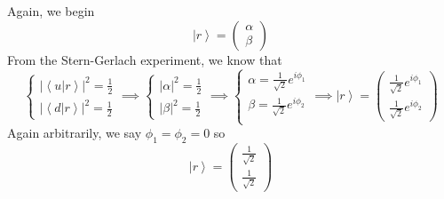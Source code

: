 \documentclass[12pt]{article}
\newcommand{\brak}[1]{\left\langle #1 \right\rangle}
\newcommand{\ket}[1]{\left\vert #1 \right\rangle}
\begin{document}
Again, we begin 
\[\ket{r} = \begin{pmatrix}
    \alpha\\\beta
\end{pmatrix}\]
From the Stern-Gerlach experiment, we know that 
\[\begin{cases}
    |\brak{u|r}|^2 = \frac{1}{2}\\
    |\brak{d|r}|^2 = \frac{1}{2} 
\end{cases} \implies \begin{cases}
    |\alpha|^2 = \frac{1}{2}\\
    |\beta|^2= \frac{1}{2}
\end{cases} \implies \begin{cases}
    \alpha = \frac{1}{\sqrt 2} e^{i\phi_1}\\
    \beta = \frac{1}{\sqrt 2} e^{i\phi_2}\\
\end{cases} \implies \ket{r} = \begin{pmatrix}
    \frac{1}{\sqrt 2} e^{i\phi_1}\\
    \frac{1}{\sqrt 2} e^{i\phi_2}
\end{pmatrix}\]
Again arbitrarily, we say $\phi_1 = \phi_2 = 0$ so 
\[\ket{r} = \begin{pmatrix}
    \frac{1}{\sqrt 2}\\
    \frac{1}{\sqrt 2}
\end{pmatrix}\]
\end{document}
